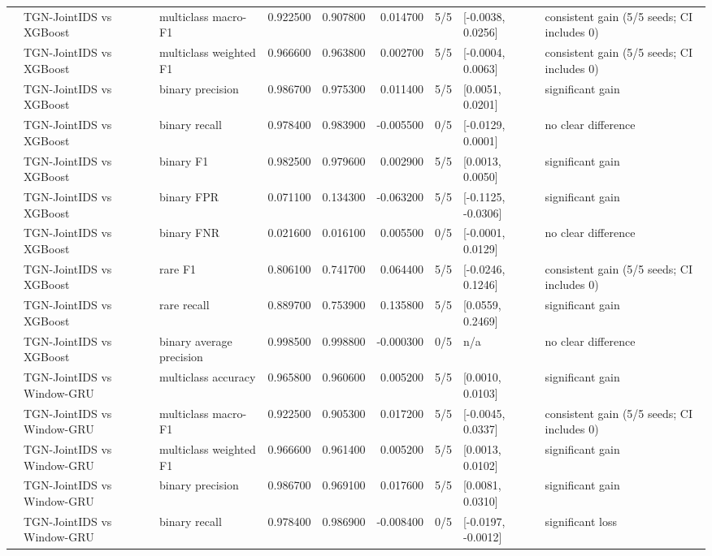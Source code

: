\begin{table}
\begin{tabular}{lllrrrlll}
 & TGN-JointIDS vs XGBoost & multiclass macro-F1 & 0.922500 & 0.907800 & 0.014700 & 5/5 & [-0.0038, 0.0256] & consistent gain (5/5 seeds; CI includes 0) \\
 & TGN-JointIDS vs XGBoost & multiclass weighted F1 & 0.966600 & 0.963800 & 0.002700 & 5/5 & [-0.0004, 0.0063] & consistent gain (5/5 seeds; CI includes 0) \\
 & TGN-JointIDS vs XGBoost & binary precision & 0.986700 & 0.975300 & 0.011400 & 5/5 & [0.0051, 0.0201] & significant gain \\
 & TGN-JointIDS vs XGBoost & binary recall & 0.978400 & 0.983900 & -0.005500 & 0/5 & [-0.0129, 0.0001] & no clear difference \\
 & TGN-JointIDS vs XGBoost & binary F1 & 0.982500 & 0.979600 & 0.002900 & 5/5 & [0.0013, 0.0050] & significant gain \\
 & TGN-JointIDS vs XGBoost & binary FPR & 0.071100 & 0.134300 & -0.063200 & 5/5 & [-0.1125, -0.0306] & significant gain \\
 & TGN-JointIDS vs XGBoost & binary FNR & 0.021600 & 0.016100 & 0.005500 & 0/5 & [-0.0001, 0.0129] & no clear difference \\
 & TGN-JointIDS vs XGBoost & rare F1 & 0.806100 & 0.741700 & 0.064400 & 5/5 & [-0.0246, 0.1246] & consistent gain (5/5 seeds; CI includes 0) \\
 & TGN-JointIDS vs XGBoost & rare recall & 0.889700 & 0.753900 & 0.135800 & 5/5 & [0.0559, 0.2469] & significant gain \\
 & TGN-JointIDS vs XGBoost & binary average precision & 0.998500 & 0.998800 & -0.000300 & 0/5 & n/a & no clear difference \\
 & TGN-JointIDS vs Window-GRU & multiclass accuracy & 0.965800 & 0.960600 & 0.005200 & 5/5 & [0.0010, 0.0103] & significant gain \\
 & TGN-JointIDS vs Window-GRU & multiclass macro-F1 & 0.922500 & 0.905300 & 0.017200 & 5/5 & [-0.0045, 0.0337] & consistent gain (5/5 seeds; CI includes 0) \\
 & TGN-JointIDS vs Window-GRU & multiclass weighted F1 & 0.966600 & 0.961400 & 0.005200 & 5/5 & [0.0013, 0.0102] & significant gain \\
 & TGN-JointIDS vs Window-GRU & binary precision & 0.986700 & 0.969100 & 0.017600 & 5/5 & [0.0081, 0.0310] & significant gain \\
 & TGN-JointIDS vs Window-GRU & binary recall & 0.978400 & 0.986900 & -0.008400 & 0/5 & [-0.0197, -0.0012] & significant loss \\

\end{tabular}
\end{table}
